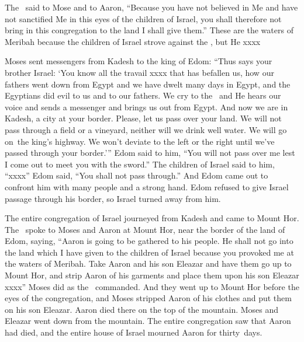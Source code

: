 \begin{inparaenum}
   The \lord\ said to Mose and to Aaron, ``Because you have not believed in Me and have not sanctified Me in this eyes of the children of Israel, you shall therefore not bring in this congregation to the land I shall give them.''%
   These are the waters of Meribah because the children of Israel strove against the \lord, but He xxxx%

   Moses sent messengers from Kadesh to the king of Edom: ``Thus says your brother Israel: `You know all the travail xxxx that has befallen us,%
   how our fathers went down from Egypt and we have dwelt many days in Egypt, and the Egyptians did evil to us and to our fathers.%
   We cry to the \lord\ and He hears our voice and sends a messenger and brings us out from Egypt. And now we are in Kadesh, a city at your border.%
   Please, let us pass over your land. We will not pass through a field or a vineyard, neither will we drink well water. We will go on\understood{}\ the king's highway. We won't deviate to the left or the right until we've passed through your border.'\thinspace''%
   Edom said to him, ``You will not pass over me lest I come out to meet you with the sword.''%
   The children of Israel said to him, ``xxxx''%
   Edom said, ``You shall not pass through.'' And Edom came out to confront him with many people and a strong hand.%
   Edom refused to give Israel passage through his border, so Israel turned away from him.%

   The entire congregation of Israel journeyed from Kadesh and came to Mount Hor.%
   The \lord\ spoke to Moses and Aaron at Mount Hor, near the border of the land of Edom, saying,%
   ``Aaron is going to be gathered to his people. He shall not go into the land which I have given to the children of Israel because you provoked me at the waters of Meribah.%
   Take Aaron and his son Eleazar and have them go up to Mount Hor,%
   and strip Aaron of his garments and place them upon his son Eleazar xxxx''%
   Moses did as the \lord\ commanded. And they went up to Mount Hor before the eyes of the congregation,%
   and Moses stripped Aaron of his clothes and put them on his son Eleazar. Aaron died there on the top of the mountain. Moses and Eleazar went down from the mountain.%
   The entire congregation saw that Aaron had died, and the entire house of Israel mourned Aaron for thirty~days.%
\end{inparaenum}

